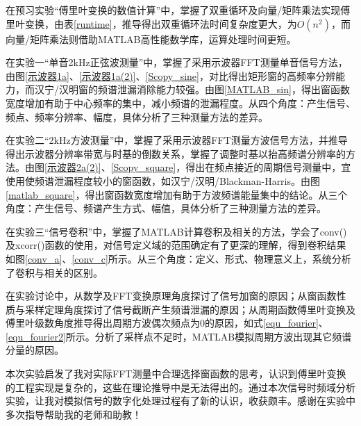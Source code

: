 \documentclass[12pt]{article}
\begin{document}
在预习实验“傅里叶变换的数值计算”中，掌握了双重循环及向量/矩阵乘法实现傅里叶变换，由表\ref{runtime}，推导得出双重循环法时间复杂度更大，为$O(n^2)$，而向量/矩阵乘法则借助MATLAB高性能数学库，运算处理时间更短。

在实验一“单音2kHz正弦波测量”中，掌握了采用示波器FFT测量单音信号方法，由图\ref{示波器1a}、\ref{示波器1a(2)}、\ref{Scopy_sine}，对比得出矩形窗的高频率分辨能力，而汉宁/汉明窗的频谱泄漏消除能力较强。由图\ref{MATLAB_sin}，得出窗函数宽度增加有助于中心频率的集中，减小频谱的泄漏程度。从四个角度：产生信号、频点、频率分辨率、幅度，具体分析了三种测量方法的差异。

在实验二“2kHz方波测量”中，掌握了采用示波器FFT测量方波信号方法，并推导得出示波器分辨率带宽与时基的倒数关系，掌握了调整时基以抬高频谱分辨率的方法。由图\ref{示波器2a(2)}、\ref{Scopy_square}，得出在频点接近的周期信号测量中，宜使用使频谱泄漏程度较小的窗函数，如汉宁/汉明/Blackman-Harris。由图\ref{matlab_square}，得出窗函数宽度增加有助于方波频谱能量集中的结论。从三个角度：产生信号、频谱产生方式、幅值，具体分析了三种测量方法的差异。

在实验三“信号卷积”中，掌握了MATLAB计算卷积及相关的方法，学会了conv()及xcorr()函数的使用，对信号定义域的范围确定有了更深的理解，得到卷积结果如图\ref{conv_a}、\ref{conv_c}所示。从三个角度：定义、形式、物理意义上，系统分析了卷积与相关的区别。

在实验讨论中，从数学及FFT变换原理角度探讨了信号加窗的原因；从窗函数性质与采样定理角度探讨了信号截断产生频谱泄漏的原因；从周期函数傅里叶变换及傅里叶级数角度推导得出周期方波偶次频点为0的原因，如式\ref{equ_fourier}、\ref{equ_fourier2}所示。分析了采样点不足时，MATLAB模拟周期方波出现其它频谱分量的原因。

本次实验启发了我对实际FFT测量中合理选择窗函数的思考，认识到傅里叶变换的工程实现是复杂的，这些在理论推导中是无法得出的。通过本次信号时频域分析实验，让我对模拟信号的数字化处理过程有了新的认识，收获颇丰。感谢在实验中多次指导帮助我的老师和助教！
\end{document}
